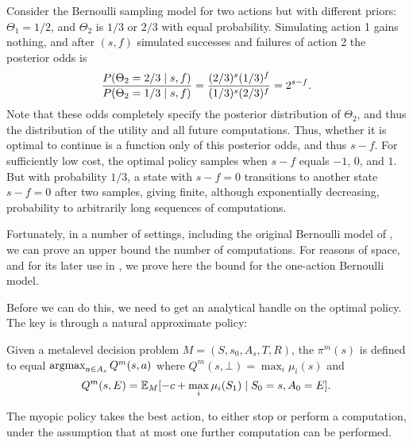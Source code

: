 \begin{example}\label{example:sprt}
Consider the Bernoulli sampling model for two actions but with different priors:
	$\Theta_1=1/2$,
	and $\Theta_2$ is $1/3$ or $2/3$ with equal probability.
%
Simulating action 1 gains nothing, and after $(s,f)$ simulated successes and failures of action 2
the posterior odds is
\[
	\frac{P(\Theta_2=2/3\mathrel{|} s,f)}{P(\Theta_2=1/3\mathrel{|} s,f)} = \frac{(2/3)^s(1/3)^f}{(1/3)^s(2/3)^f}= 2^{s-f}.
\]
Note that these odds completely specify the posterior distribution of $\Theta_2$,
and thus the distribution of the utility and all future computations.  Thus, whether
it is optimal to continue is a function only of this posterior odds, and thus $s-f$.
For sufficiently low cost, the 
optimal policy samples when $s-f$ equals $-1$, $0$, and $1$.  But with probability
$1/3$, a state with $s-f=0$ transitions to another state $s-f=0$ after two samples, 
giving finite, although exponentially decreasing, probability to arbitrarily long 
sequences of computations.
\end{example}


Fortunately, in a number of settings, including the original Bernoulli model of ,
we can prove an upper bound the number of computations.  For reasons of space,
and for its later use in , we prove here the bound for the one-action Bernoulli model.

Before we can do this, we need to get an analytical handle on the optimal policy.
The key is through a natural approximate policy:

\begin{dfn}\label{dfn:myopic}
	Given a metalevel decision problem $M=(S,s_0,A_s,T,R)$,
	the  $\pi^m(s)$ is defined to equal $\operatorname*{argmax}_{a\in A_s} Q^m(s,a)$ 
	where $Q^m(s,\bot) = \max_i \mu_i(s)$ and
	\begin{equation}\label{eq:myopic}
		 Q^m(s,E) = \mathbb{E}_M[ -c + \max_i \mu_i(S_1) \mathrel{|} S_0 = s, A_0 = E].		
	\end{equation}
\end{dfn}

The myopic policy takes the best action, to either stop or perform a computation,
under the assumption that at most one further computation can be performed.

